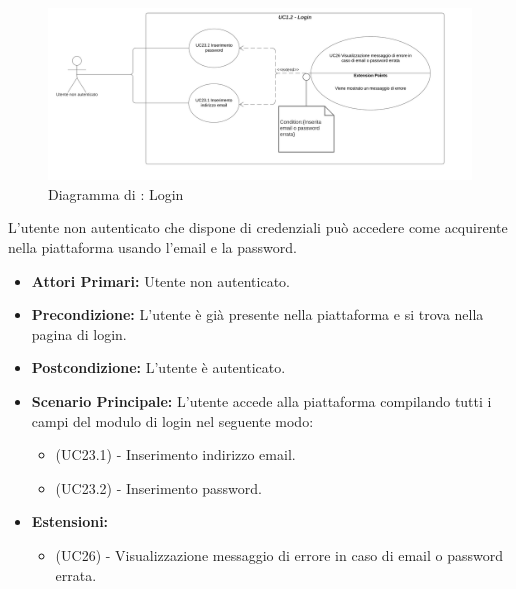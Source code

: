 
\begin{figure}[H]
    \centering
    \includegraphics[scale=0.6]{Immagini/DiagrammiUC/UC1.2Login.png}
    \caption{Diagramma di \actualUC: Login} 
    \label{fig:Login}
\end{figure}

L'utente non autenticato che dispone di credenziali può accedere come acquirente nella piattaforma usando l'email e la password.
\begin{itemize}
    \item \textbf{Attori Primari:} Utente non autenticato.
    \item \textbf{Precondizione:} L'utente è già presente nella piattaforma e si trova nella pagina di login.
    \item \textbf{Postcondizione:} L'utente è autenticato.
    \item \textbf{Scenario Principale:} L'utente accede alla piattaforma compilando tutti i campi del modulo di login nel seguente modo:
    \begin{itemize}
        \item (UC23.1) - Inserimento indirizzo email.
        \item (UC23.2) - Inserimento password.
    \end{itemize}
    \item \textbf{Estensioni:}
    \begin{itemize}
        \item (UC26) - Visualizzazione messaggio di errore in caso di email o password errata.
    \end{itemize}
\end{itemize}


